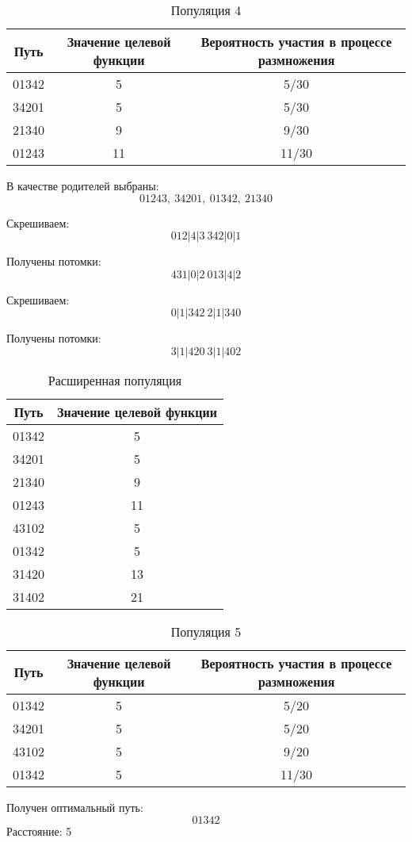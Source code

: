 \documentclass{article}
\begin{document}
\begin{table}[H]
    \centering
    \caption{Популяция 4}
    \begin{tabular}{|c|c|c|}
    \hline
    Путь& Значение целевой функции& Вероятность участия в процессе размножения\\
    \hline
    01342 & 5 & 5/30\\
    34201 & 5 & 5/30\\
    21340 & 9 & 9/30\\
    01243 & 11 & 11/30\\\hline
    \end{tabular}
\end{table}

В качестве родителей выбраны:
\[01243,\ 34201,\ 01342,\ 21340\]

Скрешиваем: \[012|4|3\ 342|0|1\]

Получены потомки: \[431|0|2\ 013|4|2\]

Скрешиваем: \[0|1|342\ 2|1|340\]

Получены потомки: \[3|1|420\ 3|1|402\]

\begin{table}[H]
    \centering
    \caption{Расширенная популяция}
    \begin{tabular}{|c|c|}
    \hline
    Путь& Значение целевой функции\\
    \hline
    01342 & 5\\
    34201 & 5\\
    21340 & 9\\
    01243 & 11\\
    43102 & 5\\
    01342 & 5\\
    31420 & 13\\
    31402 & 21\\
    \hline
    \end{tabular}
\end{table}

\begin{table}[H]
    \centering
    \caption{Популяция 5}
    \begin{tabular}{|c|c|c|}
    \hline
    Путь& Значение целевой функции& Вероятность участия в процессе размножения\\
    \hline
    01342 & 5 & 5/20\\
    34201 & 5 & 5/20\\
    43102 & 5 & 9/20\\
    01342 & 5 & 11/30\\\hline
    \end{tabular}
\end{table}
Получен оптимальный путь: \[01342\] Расстояние: 5
\end{document}
